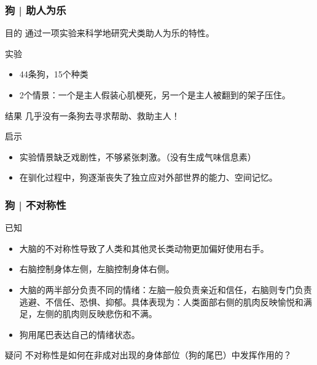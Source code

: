 \begin{frame}
  \frametitle{狗 | 助人为乐}
  \begin{block}{目的}
    通过一项实验来科学地研究犬类助人为乐的特性。
  \end{block}
  \pause
  \begin{block}{实验}
    \begin{itemize}
      \item 44条狗，15个种类
      \item 2个情景：一个是主人假装心肌梗死，另一个是主人被翻到的架子压住。
    \end{itemize}
  \end{block}
  \pause
  \begin{block}{结果}
    几乎没有一条狗去寻求帮助、救助主人！
  \end{block}
  \pause
  \begin{block}{启示}
    \begin{itemize}
      \item 实验情景缺乏戏剧性，不够紧张刺激。（没有生成气味信息素）
      \item 在驯化过程中，狗逐渐丧失了独立应对外部世界的能力、空间记忆。
    \end{itemize}
  \end{block}
\end{frame}

\begin{frame}
  \frametitle{狗 | 不对称性}
  \begin{block}{已知}
    \begin{itemize}
      \item 大脑的不对称性导致了人类和其他灵长类动物更加偏好使用右手。
      \item 右脑控制身体左侧，左脑控制身体右侧。
      \item 大脑的两半部分负责不同的情绪：左脑一般负责亲近和信任，右脑则专门负责逃避、不信任、恐惧、抑郁。具体表现为：人类面部右侧的肌肉反映愉悦和满足，左侧的肌肉则反映悲伤和不满。
      \item 狗用尾巴表达自己的情绪状态。
    \end{itemize}
  \end{block}
  \pause
  \begin{block}{疑问}
    不对称性是如何在非成对出现的身体部位（狗的尾巴）中发挥作用的？
  \end{block}
\end{frame}

